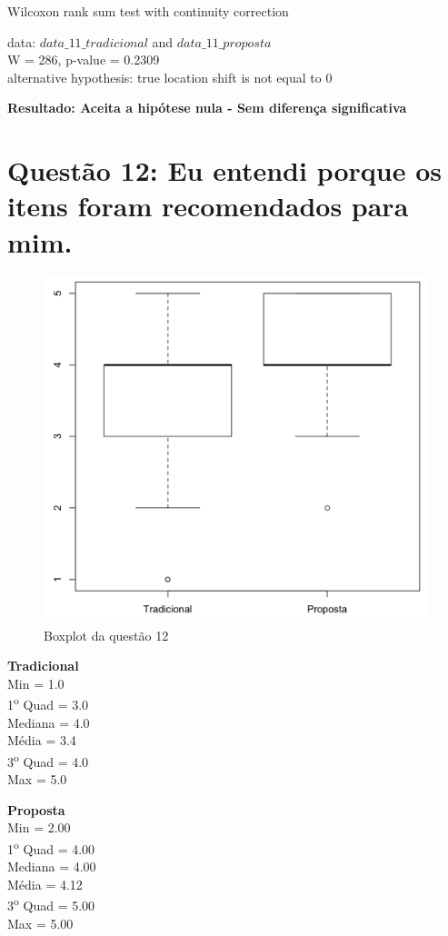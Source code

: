 Wilcoxon rank sum test with continuity correction

\noindent
data:  $data\_11\_tradicional$ and $data\_11\_proposta$\\
W = 286, p-value = 0.2309\\
alternative hypothesis: true location shift is not equal to 0

\noindent
\textbf{Resultado: Aceita a hipótese nula - Sem diferença significativa}

\newpage
\section{Questão 12: Eu entendi porque os itens foram recomendados para mim.}

\begin{figure}[htb]
  \caption{\label{fig:questao12-boxplot}Boxplot da questão 12}
  \begin{center}
      \includegraphics[scale=0.4]{./Figuras/questao12-boxplot.png}
  \end{center}
\end{figure}

\begin{multicols}{2}

\noindent\textbf{Tradicional}\\
Min = 1.0\\
1\textsuperscript{o} Quad = 3.0\\
Mediana = 4.0\\
Média = 3.4\\
3\textsuperscript{o} Quad = 4.0\\
Max = 5.0\\
\columnbreak

\noindent\textbf{Proposta}\\
Min = 2.00\\
1\textsuperscript{o} Quad = 4.00\\
Mediana = 4.00\\
Média = 4.12\\
3\textsuperscript{o} Quad = 5.00\\
Max = 5.00
\end{multicols}

